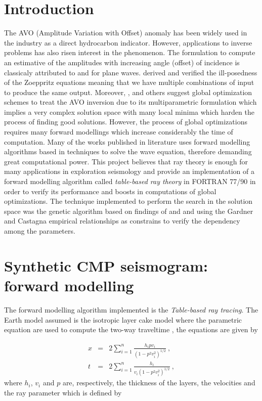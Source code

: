 \documentclass{vie16}
\begin{document}
\section{Introduction}
The AVO (Amplitude Variation with Offset) anomaly has been widely used in 
the industry as a direct hydrocarbon indicator. However, applications to 
inverse problems has also risen interest in the phenomenon. The 
formulation to compute an estimative of the amplitudes with increasing 
angle (offset) of incidence is classicaly attributed to \cite{Zoeppritz1919} 
and \cite{Knott1899} for plane waves. \cite{Rosa1976} derived and verified 
the ill-posedness of the Zoeppritz equations meaning that we have multiple  
combinations of input to produce the same output.  Moreover, 
\cite{Stoffa1991}, \cite{Mallick1995} and others suggest global optimization 
schemes to treat the AVO inversion due to its multiparametric formulation 
which implies a very complex solution space with many local minima which 
harden the process of finding good solutions. However, the process of 
global optimizations requires many forward modellings which increase 
considerably the time of computation. Many of the works published in 
literature uses forward modelling algorithms based in techniques to solve 
the wave equation, therefore demanding great computational power. This 
project believes that ray theory is enough for many applications in 
exploration seismology and provide an implementation of a forward 
modelling algorithm called \textit{table-based ray theory} in FORTRAN 
77/90 in order to verify its performance and boosts in computations of 
global optimizations. The technique implemented to perform the search in 
the solution space was the genetic algorithm based on findings of 
\cite{Stoffa1991} and \cite{Sen1992} and using the Gardner and Castagna 
empirical relationships as constrains to verify the dependency among the 
parameters.

\section{Synthetic CMP seismogram: forward modelling}
The forward modelling algorithm implemented is the \textit{Table-based ray 
tracing}. The Earth model assumed is the isotropic layer cake model where 
the parametric equation are used to compute the two-way traveltime 
\cite{Slotnick}, the equations are given by

\begin{eqnarray}
x & = & 2\sum_{i=1}^{n} \frac {h_{i}pv_{i}} {(1 -
p^{2}v_{i}^{2})^{1/2}} \ ,\label{eq.x} \\
t & = & 2\sum_{i=1}^{n} \frac {h_{i}} {v_{i}(1 - p^{2}v_{i}^{2})^{1/2}} \ ,
\label{eq.t}
\end{eqnarray}
%
where $h_{i}$, $v_{i}$ and $p$ are, respectively, the thickness of the layers, 
the velocities and the ray parameter which is defined by
\end{document}
